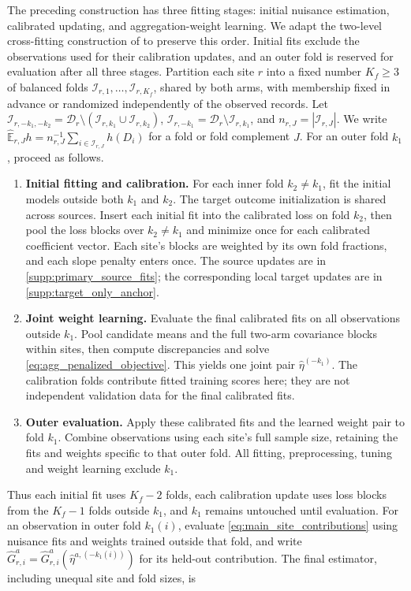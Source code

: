 \documentclass[12pt]{article}
\providecommand{\En}{\widehat{\mathbb E}}
\begin{document}
The preceding construction has three fitting stages: initial nuisance estimation, calibrated updating, and aggregation-weight learning. We adapt the two-level cross-fitting construction of \citet{hou2025efficient} to preserve this order. Initial fits exclude the observations used for their calibration updates, and an outer fold is reserved for evaluation after all three stages. Partition each site $r$ into a fixed number $K_f\ge3$ of balanced folds $\mathcal I_{r,1},\ldots,\mathcal I_{r,K_f}$, shared by both arms, with membership fixed in advance or randomized independently of the observed records. Let $\mathcal I_{r,-k_1,-k_2}=\mathcal D_r\setminus(\mathcal I_{r,k_1}\cup\mathcal I_{r,k_2})$, $\mathcal I_{r,-k_1}=\mathcal D_r\setminus\mathcal I_{r,k_1}$, and $n_{r,J}=|\mathcal I_{r,J}|$. We write $\En_{r,J}h=n_{r,J}^{-1}\sum_{i\in\mathcal I_{r,J}}h(D_i)$ for a fold or fold complement $J$. For an outer fold $k_1$, proceed as follows.
\begin{enumerate}[label=\arabic*.,leftmargin=*,itemsep=.5\baselineskip]
\item \textbf{Initial fitting and calibration.} For each inner fold $k_2\ne k_1$, fit the initial models outside both $k_1$ and $k_2$. The target outcome initialization is shared across sources. Insert each initial fit into the calibrated loss on fold $k_2$, then pool the loss blocks over $k_2\ne k_1$ and minimize once for each calibrated coefficient vector. Each site's blocks are weighted by its own fold fractions, and each slope penalty enters once. The source updates are in \cref{supp:primary_source_fits}; the corresponding local target updates are in \cref{supp:target_only_anchor}.
\item \textbf{Joint weight learning.} Evaluate the final calibrated fits on all observations outside $k_1$. Pool candidate means and the full two-arm covariance blocks within sites, then compute discrepancies and solve \cref{eq:agg_penalized_objective}. This yields one joint pair $\widehat\eta^{(-k_1)}$. The calibration folds contribute fitted training scores here; they are not independent validation data for the final calibrated fits.
\item \textbf{Outer evaluation.} Apply these calibrated fits and the learned weight pair to fold $k_1$. Combine observations using each site's full sample size, retaining the fits and weights specific to that outer fold. All fitting, preprocessing, tuning and weight learning exclude $k_1$.
\end{enumerate}
Thus each initial fit uses $K_f-2$ folds, each calibration update uses loss blocks from the $K_f-1$ folds outside $k_1$, and $k_1$ remains untouched until evaluation. For an observation in outer fold $k_1(i)$, evaluate \cref{eq:main_site_contributions} using nuisance fits and weights trained outside that fold, and write $\widehat G_{r,i}^a=\widehat G_{r,i}^a(\widehat\eta^{a,(-k_1(i))})$ for its held-out contribution. The final estimator, including unequal site and fold sizes, is
\end{document}
